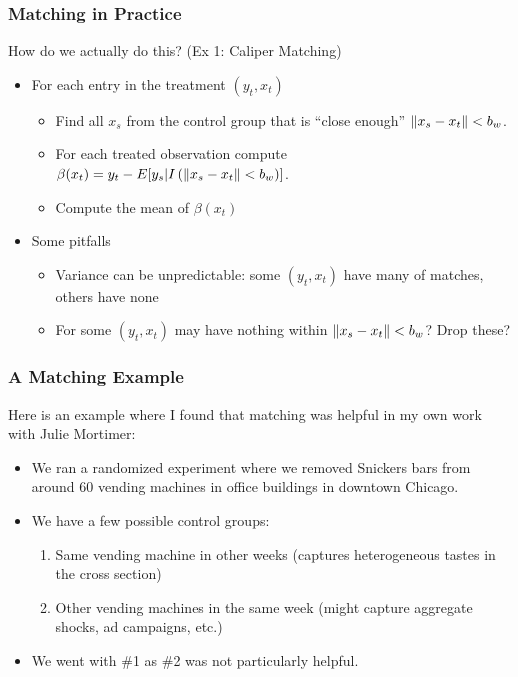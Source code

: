\documentclass[xcolor=pdftex,dvipsnames,table,mathserif,aspectratio=169]{beamer}
\DeclarePairedDelimiter\norm{\lVert}{\rVert}%
\begin{document}
\begin{frame}
\frametitle{Matching in Practice}
How do we actually do this? (Ex 1: \alert{Caliper Matching})
\begin{itemize}
\item For each entry in the treatment $(y_t,x_t)$
\begin{itemize}
\item Find all $x_s$ from the control group that is ``close enough''  $\norm{x_s -x_t}<b_w$.
\item For each treated observation compute $\beta(x_t) = y_t - E[y_s |  I \left( \norm{x_s -x_t}<b_w\right)]$.
\item Compute the mean of $\beta(x_t)$
\end{itemize}
\item Some pitfalls
\begin{itemize}
\item Variance can be unpredictable: some $(y_t,x_t)$ have many of matches, others have none
\item For some $(y_t,x_t)$ may have nothing within $\norm{x_s -x_t}<b_w$? Drop these?
\end{itemize}

\end{itemize}
\end{frame}



\begin{frame}
\frametitle{A Matching Example}
Here is an example where I found that matching was helpful in my own work with Julie Mortimer:
\begin{itemize}
\item We ran a randomized experiment where we removed Snickers bars from around 60 vending machines in office buildings in downtown Chicago.
\item We have a few possible control groups:
\begin{enumerate}
\item Same vending machine in other weeks (captures heterogeneous tastes in the cross section)
\item Other vending machines in the same week (might capture aggregate shocks, ad campaigns, etc.)
\end{enumerate}
\item We went with \#1 as \#2 was not particularly helpful.
\end{itemize}
\end{frame}
\end{document}

